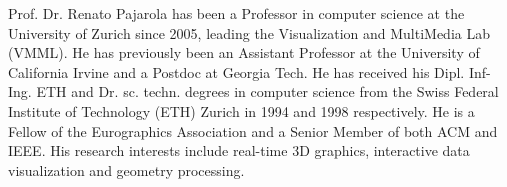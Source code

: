 \documentclass[10pt,journal,compsoc]{IEEEtran}
\begin{document}
\begin{IEEEbiography}{Prof. Dr. Renato Pajarola}
has been a Professor in computer science at the University of Zurich since 2005, leading the Visualization and MultiMedia Lab (VMML). He has previously been an Assistant Professor at the University of California Irvine and a Postdoc at Georgia Tech. He has received his Dipl. Inf-Ing. ETH and Dr. sc. techn. degrees in computer science from the Swiss Federal Institute of Technology (ETH) Zurich in 1994 and 1998 respectively. He is a Fellow of the Eurographics Association and a Senior Member of both ACM and IEEE. His research interests include real-time 3D graphics, interactive data visualization and geometry processing.
\end{IEEEbiography}




\end{document}
